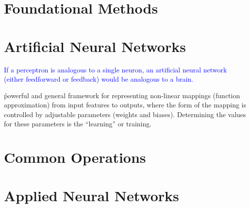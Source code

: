 \chapter{Foundational Methods}















\chapter{Artificial Neural Networks}

\textcolor{blue}{If a perceptron is analogous to a single neuron, an artificial neural network (either feedforward or feedback) would be analogous to a brain.}

\r{powerful and general framework for representing non-linear mappings (function approximation) from input features to outputs, where the form of the mapping is controlled by adjustable parameters (weights and biases). Determining the values for these parameters is the ``learning'' or training.}









\chapter{Common Operations}



\chapter{Applied Neural Networks}

